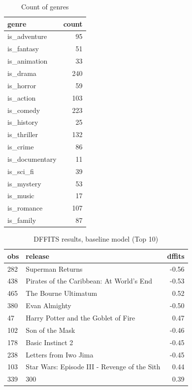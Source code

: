 \documentclass[10pt]{article}
\begin{document}
\begin{table}[H]
\centering
\caption{Count of genres\label{genre_count}}
\begin{tabular}{lr}
\toprule
genre & count  \\
\midrule
is\_adventure & 95 \\
is\_fantasy & 51 \\
is\_animation & 33 \\
is\_drama & 240 \\
is\_horror & 59 \\
is\_action & 103 \\
is\_comedy & 223 \\
is\_history & 25 \\
is\_thriller & 132 \\
is\_crime & 86 \\
is\_documentary & 11 \\
is\_sci\_fi & 39 \\
is\_mystery & 53 \\
is\_music & 17 \\
is\_romance & 107 \\
is\_family & 87 \\
\bottomrule
\end{tabular}
\end{table}

\begin{table}[H]
\caption{DFFITS results, baseline model (Top 10)\label{dffits}}
\begin{tabular}{llr}
\toprule
 obs & release & dffits \\
\midrule
282 & Superman Returns & -0.56 \\
438 & Pirates of the Caribbean: At World's End & -0.53 \\
465 & The Bourne Ultimatum & 0.52 \\
380 & Evan Almighty & -0.50 \\
47 & Harry Potter and the Goblet of Fire & 0.47 \\
102 & Son of the Mask & -0.46 \\
178 & Basic Instinct 2 & -0.45 \\
238 & Letters from Iwo Jima & -0.45 \\
103 & Star Wars: Episode III - Revenge of the Sith & 0.44 \\
339 & 300 & 0.39 \\
\bottomrule
\end{tabular}
\end{table}
\end{document}
